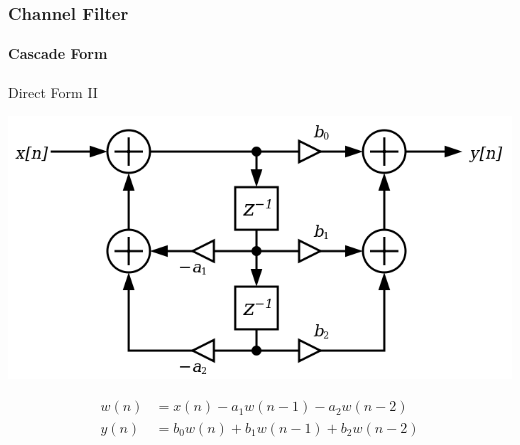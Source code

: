 \begin{frame} \frametitle{Channel Filter}
        \framesubtitle{Cascade Form}
Direct Form II
    \begin{center}
        \includegraphics[scale=0.3]{img/biquadDF2}
    \end{center}

\begin{equation*}
        \begin{aligned}
    w(n) &= x(n)     - a_1 w(n-1) - a_2 w(n-2)   \\
    y(n) &= b_0 w(n) + b_1 w(n-1) + b_2 w(n-2)
    \label{eq:df2}
\end{aligned}
\end{equation*}
\end{frame}


